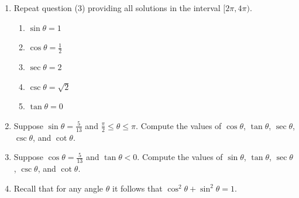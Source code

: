 \documentclass[12pt]{article}
\newif\ifans
\begin{document}
\begin{enumerate}
\begin{enumerate}
\ifans\fbox{$\theta=0$ or $\theta=\pi$}\fi

\end{enumerate}

\item Repeat question (3) providing all solutions in the interval $[2\pi,4\pi)$.

\begin{enumerate}

\item $\sin{\theta}=1$

\ifans\fbox{$\theta=\frac{5\pi}{2}$}\fi

\item $\cos{\theta}=\frac{1}{2}$

\ifans\fbox{$\theta=\frac{7\pi}{3}$ or $\theta=\frac{11\pi}{3}$}\fi

\item $\sec{\theta}=2$

\ifans\fbox{$\theta=\frac{7\pi}{3}$ or $\theta=\frac{11\pi}{3}$}\fi

\item $\csc{\theta}=\sqrt{2}$

\ifans\fbox{$\theta=\frac{9\pi}{4}$ or $\theta=\frac{11\pi}{4}$}\fi

\item $\tan{\theta}=0$

\ifans\fbox{$\theta=2\pi$ or $\theta=3\pi$}\fi

\end{enumerate}

\item Suppose $\sin{\theta}=\frac{5}{13}$ and $\frac{\pi}{2} \leq \theta \leq \pi$.  Compute the values of $\cos{\theta}$, $\tan{\theta}$, $\sec{\theta}$, $\csc{\theta}$, and $\cot{\theta}$.

\ifans\fbox{$\cos{\theta}=-\frac{12}{13}$, $\tan{\theta}=-\frac{5}{12}$, $\sec{\theta}=-\frac{13}{12}$, $\csc{\theta}=\frac{13}{5}$, and $\cot{\theta}=-\frac{12}{5}$} \fi

\item Suppose $\cos{\theta}=\frac{5}{13}$ and $\tan{\theta}<0$.  Compute the values of $\sin{\theta}$, $\tan{\theta}$, $\sec{\theta}$, $\csc{\theta}$, and $\cot{\theta}$.

\ifans\fbox{$\sin{\theta}=-\frac{12}{13}$, $\tan{\theta}=-\frac{12}{5}$, $\sec{\theta}=\frac{13}{5}$, $\csc{\theta}=-\frac{13}{12}$, and $\cot{\theta}=-\frac{5}{12}$} \fi

\item Recall that for any angle $\theta$ it follows that $\cos^2\theta+\sin^2\theta=1$.  


\end{enumerate}
\end{document}
